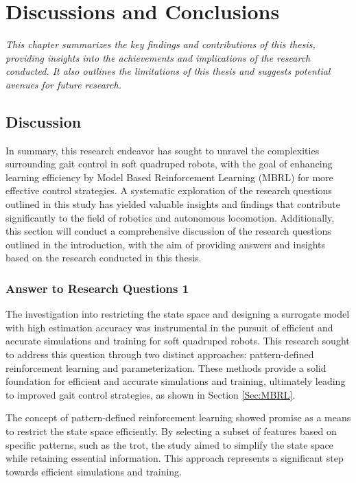 \chapter{Discussions and Conclusions}
\label{chap6}
\textit{This chapter summarizes the key findings and contributions of this thesis, providing insights into the achievements and implications of the research conducted. It also outlines the limitations of this thesis and suggests potential avenues for future research.}

\section{Discussion}
In summary, this research endeavor has sought to unravel the complexities surrounding gait control in soft quadruped robots, with the goal of enhancing learning efficiency by Model Based Reinforcement Learning (MBRL) for more effective control strategies. A systematic exploration of the research questions outlined in this study has yielded valuable insights and findings that contribute significantly to the field of robotics and autonomous locomotion. Additionally, this section will conduct a comprehensive discussion of the research questions outlined in the introduction, with the aim of providing answers and insights based on the research conducted in this thesis.

\subsection{Answer to Research Questions 1}
The investigation into restricting the state space and designing a surrogate model with high estimation accuracy was instrumental in the pursuit of efficient and accurate simulations and training for soft quadruped robots. This research sought to address this question through two distinct approaches: pattern-defined reinforcement learning and parameterization. These methods provide a solid foundation for efficient and accurate simulations and training, ultimately leading to improved gait control strategies, as shown in Section \ref{Sec:MBRL}. 

The concept of pattern-defined reinforcement learning showed promise as a means to restrict the state space efficiently. By selecting a subset of features based on specific patterns, such as the trot, the study aimed to simplify the state space while retaining essential information. This approach represents a significant step towards efficient simulations and training.

